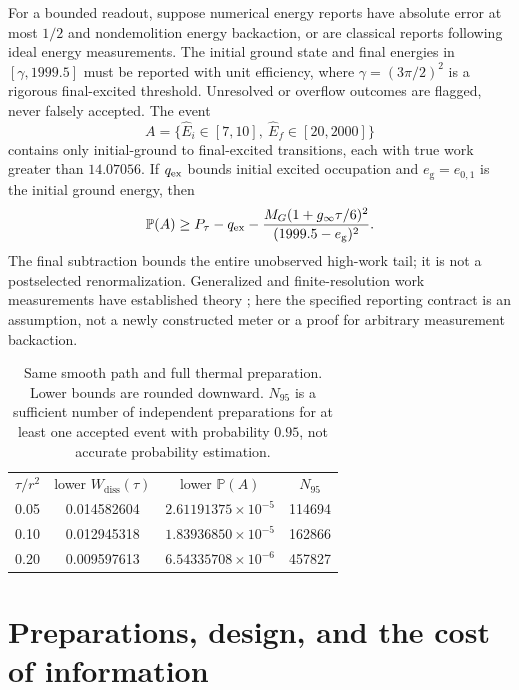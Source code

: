 \documentclass[aps,pra,reprint,superscriptaddress,longbibliography]{revtex4-2}
\newcommand{\Wd}{W_{\mathrm{diss}}}
\newcommand{\Prob}{\mathbb P}
\begin{document}
For a bounded readout, suppose numerical energy reports have absolute error at most $1/2$ and nondemolition energy backaction, or are classical reports following ideal energy measurements. The initial ground state and final energies in $[\gamma,1999.5]$ must be reported with unit efficiency, where $\gamma=(3\pi/2)^2$ is a rigorous final-excited threshold. Unresolved or overflow outcomes are flagged, never falsely accepted. The event
\begin{equation}
 A=\{\widehat E_i\in[7,10],\ \widehat E_f\in[20,2000]\}
 \label{eq:detector}
\end{equation}
contains only initial-ground to final-excited transitions, each with true work greater than $14.07056$. If $q_{\rm ex}$ bounds initial excited occupation and $e_{\mathrm g}=e_{0,1}$ is the initial ground energy, then
\begin{equation}
 \Prob(A)\ge P_\tau-q_{\rm ex}
    -\frac{M_G(1+g_\infty\tau/6)^2}{(1999.5-e_{\mathrm g})^2}.\label{eq:binlower}
\end{equation}
The final subtraction bounds the entire unobserved high-work tail; it is not a postselected renormalization. Generalized and finite-resolution work measurements have established theory \cite{Roncaglia,Ahmad}; here the specified reporting contract is an assumption, not a newly constructed meter or a proof for arbitrary measurement backaction.

\begin{table}[t]
\caption{Same smooth path and full thermal preparation. Lower bounds are rounded downward. $N_{95}$ is a sufficient number of independent preparations for at least one accepted event with probability $0.95$, not accurate probability estimation.}
\label{tab:duration}
\begin{ruledtabular}
\begin{tabular}{cccc}
$\tau/r^2$&lower $\Wd(\tau)$&lower $\Prob(A)$&$N_{95}$\\
0.05&0.014582604&$2.61191375\times10^{-5}$&114694\\
0.10&0.012945318&$1.83936850\times10^{-5}$&162866\\
0.20&0.009597613&$6.54335708\times10^{-6}$&457827
\end{tabular}
\end{ruledtabular}
\end{table}

\section{Preparations, design, and the cost of information}
\end{document}
